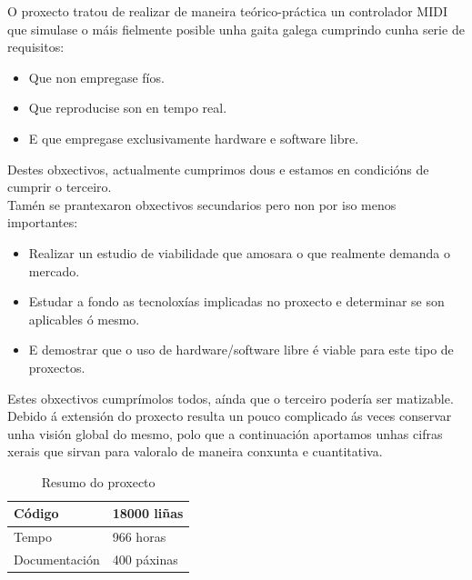  O proxecto tratou de realizar de maneira teórico-práctica un controlador MIDI
 que simulase o máis fielmente posible unha gaita galega cumprindo cunha serie
 de requisitos:
 
 \begin{itemize}
  \item Que non empregase fíos.
  \item Que reproducise son en tempo real.
  \item E que empregase exclusivamente hardware e software libre.
 \end{itemize}
 
 
 Destes obxectivos, actualmente cumprimos dous e estamos en condicións de
 cumprir o terceiro. \\
 
 Tamén se prantexaron obxectivos secundarios pero non por iso menos importantes:
 
 \begin{itemize}
  \item Realizar un estudio de viabilidade que amosara o que realmente demanda o
    mercado.
  \item Estudar a fondo as tecnoloxías implicadas no proxecto e determinar se
    son aplicables ó mesmo.
  \item E demostrar que o uso de hardware/software libre é viable para este tipo
    de proxectos.
 \end{itemize}
 
 
 Estes obxectivos cumprímolos todos, aínda que o terceiro podería ser
 matizable. \\
 
 Debido á extensión do proxecto resulta un pouco complicado ás veces conservar
 unha visión global do mesmo, polo que a continuación aportamos unhas cifras
 xerais que sirvan para valoralo de maneira conxunta e cuantitativa. \\
 
 \begin{table}[htbp]
  \centering
  \begin{tabular}{|l|l|}
   \hline
   Código & 18000 liñas \\
   \hline
   Tempo & 966 horas \\
   \hline
   Documentación & 400 páxinas \\
   \hline
  \end{tabular}
  \caption{Resumo do proxecto}
  \label{tabla:ResumoProxecto}
 \end{table}
 
